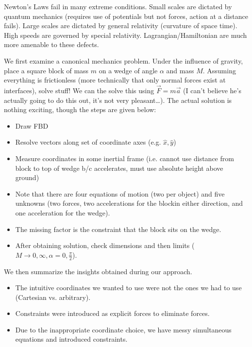\documentclass[10pt]{report}
\begin{document}
Newton's Laws fail in many extreme conditions. Small scales are dictated by quantum mechanics (requires use of potentials but not forces, action at a distance fails). Large scales are dictated by general relativity (curvature of space time). High speeds are governed by special relativity. Lagrangian/Hamiltonian are much more amenable to these defects. 

We first examine a canonical mechanics problem. Under the influence of gravity, place a square block of mass $m$ on a wedge of angle $\alpha$ and mass $M$. Assuming everything is frictionless (more technically that only normal forces exist at interfaces), solve stuff! We can the solve this using $\vec{F}=m\vec{a}$ (I can't believe he's actually going to do this out, it's not very pleasant\dots). The actual solution is nothing exciting, though the steps are given below:

\begin{itemize}
    \item Draw FBD
    \item Resolve vectors along set of coordinate axes (e.g. $\hat{x},\hat{y}$)
    \item Measure coordinates in some inertial frame (i.e. cannot use distance from block to top of wedge b/c accelerates, must use absolute height above ground)
    \item Note that there are four equations of motion (two per object) and five unknowns (two forces, two accelerations for the blockin either direction, and one acceleration for the wedge). 
    \item The missing factor is the constraint that the block sits on the wedge.
    \item After obtaining solution, check dimensions and then limits ($M \to 0,\infty, \alpha=0,\frac{\pi}{2}$).
\end{itemize}

We then summarize the insights obtained during our approach.

\begin{itemize}
    \item The intuitive coordinates we wanted to use were not the ones we had to use (Cartesian vs. arbitrary).
    \item Constraints were introduced as explicit forces to eliminate forces. 
    \item Due to the inappropriate coordinate choice, we have messy simultaneous equations and introduced constraints. 
\end{itemize}
\end{document}
